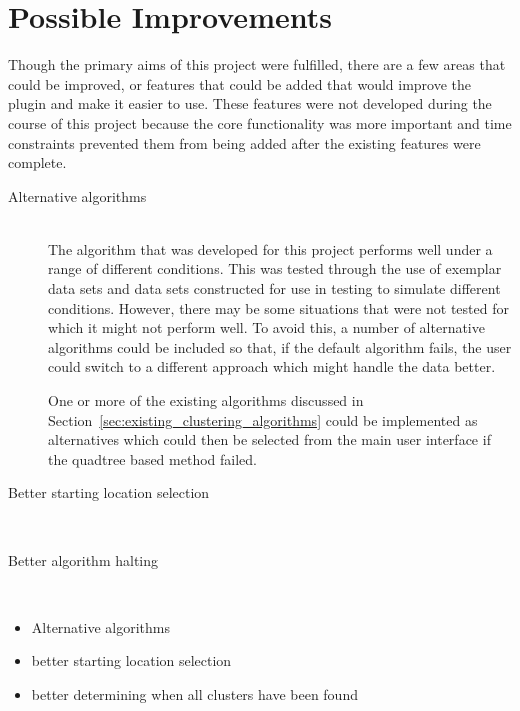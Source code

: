 
\section{Possible Improvements}
\label{sec:possible_improvements}

Though the primary  aims of this project were fulfilled, there are a few areas
that could be improved, or features that could be added that would improve the
plugin and make it easier to use. These features were not developed during the
course of this project because the core functionality was more important and
time constraints prevented them from being added after the existing features
were complete.


\begin{description}

	\item[Alternative algorithms] \hfill \\

		The algorithm that was developed for this project performs well under a
		range of different conditions. This was tested through the use of
		exemplar data sets and data sets constructed for use in testing to
		simulate different conditions. However, there may be some situations
		that were not tested for which it might not perform well. To avoid
		this, a number of alternative algorithms could be included so that, if
		the default algorithm fails, the user could switch to a different
		approach which might handle the data better.

		One or more of the existing algorithms discussed in
		Section~\ref{sec:existing_clustering_algorithms} could be implemented
		as alternatives which could then be selected from the main user
		interface if the quadtree based method failed.

	\item[Better starting location selection] \hfill \\


	\item[Better algorithm halting] \hfill \\


\end{description}

\begin{itemize}
	\item Alternative algorithms
	\item better starting location selection
	\item better determining when all clusters have been found
\end{itemize}

